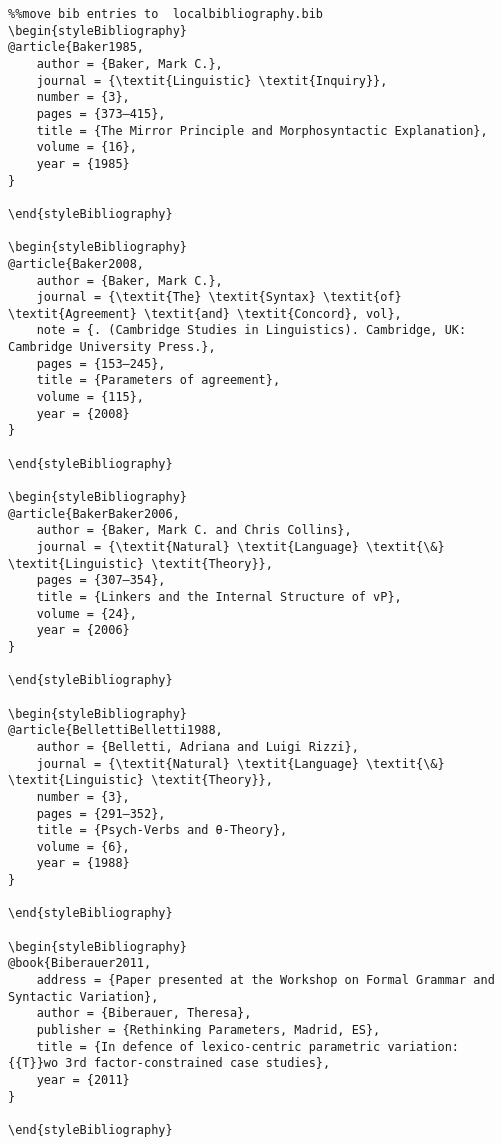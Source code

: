 \documentclass[output=paper]{langscibook}
\begin{document}
\begin{verbatim}%%move bib entries to  localbibliography.bib
\begin{styleBibliography}
@article{Baker1985,
	author = {Baker, Mark C.},
	journal = {\textit{Linguistic} \textit{Inquiry}},
	number = {3},
	pages = {373–415},
	title = {The Mirror Principle and Morphosyntactic Explanation},
	volume = {16},
	year = {1985}
}

\end{styleBibliography}

\begin{styleBibliography}
@article{Baker2008,
	author = {Baker, Mark C.},
	journal = {\textit{The} \textit{Syntax} \textit{of} \textit{Agreement} \textit{and} \textit{Concord}, vol},
	note = {. (Cambridge Studies in Linguistics). Cambridge, UK: Cambridge University Press.},
	pages = {153–245},
	title = {Parameters of agreement},
	volume = {115},
	year = {2008}
}

\end{styleBibliography}

\begin{styleBibliography}
@article{BakerBaker2006,
	author = {Baker, Mark C. and Chris Collins},
	journal = {\textit{Natural} \textit{Language} \textit{\&} \textit{Linguistic} \textit{Theory}},
	pages = {307–354},
	title = {Linkers and the Internal Structure of vP},
	volume = {24},
	year = {2006}
}

\end{styleBibliography}

\begin{styleBibliography}
@article{BellettiBelletti1988,
	author = {Belletti, Adriana and Luigi Rizzi},
	journal = {\textit{Natural} \textit{Language} \textit{\&} \textit{Linguistic} \textit{Theory}},
	number = {3},
	pages = {291–352},
	title = {Psych-Verbs and θ-Theory},
	volume = {6},
	year = {1988}
}

\end{styleBibliography}

\begin{styleBibliography}
@book{Biberauer2011,
	address = {Paper presented at the Workshop on Formal Grammar and Syntactic Variation},
	author = {Biberauer, Theresa},
	publisher = {Rethinking Parameters, Madrid, ES},
	title = {In defence of lexico-centric parametric variation: {{T}}wo 3rd factor-constrained case studies},
	year = {2011}
}

\end{styleBibliography}


\end{verbatim}
\end{document}
